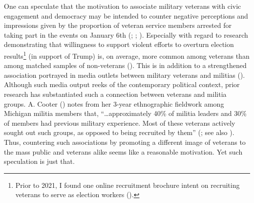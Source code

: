 \documentclass[
  11pt,
  a4paper,
]{scrartcl}
\begin{document}
One can speculate that the motivation to associate military veterans
with civic engagement and democracy may be intended to counter negative
perceptions and impressions given by the proportion of veteran service
members arrested for taking part in the events on January 6th
(;
;
). Especially with
regard to research demonstrating that willingness to support violent
efforts to overturn election results\footnote{Prior to 2021, I found one
  online recruitment brochure intent on recruiting veterans to serve as
  election workers ().} (in support of Trump) is, on average,
more common among veterans than among matched samples of non-veterans
(). This is in addition to a
strengthened association portrayed in media outlets between military
veterans and militias ().
Although such media output reeks of the contemporary political context,
prior research has substantiated such a connection between veterans and
militia groups. A. Cooter () notes from
her 3-year ethnographic fieldwork among Michigan militia members that,
``\ldots approximately 40\% of militia leaders and 30\% of members had
previous military experience. Most of these veterans actively sought out
such groups, as opposed to being recruited by them''
(; see also ). Thus, countering such associations by promoting a
different image of veterans to the mass public and veterans alike seems
like a reasonable motivation. Yet such speculation is just that.
\end{document}
